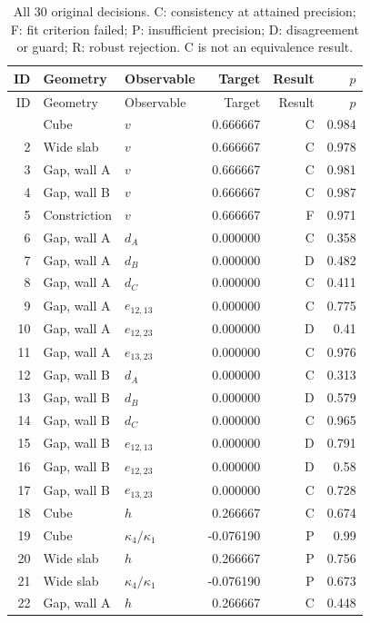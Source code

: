 {\small\setlength{\tabcolsep}{3.5pt}
\begin{longtable}{rllrrr}
\caption{All 30 original decisions. C: consistency at attained precision; F: fit criterion failed; P: insufficient precision; D: disagreement or guard; R: robust rejection. C is not an equivalence result.}\\
\toprule
ID & Geometry & Observable & Target & Result & $p$\\
\midrule
\endfirsthead
\toprule
ID & Geometry & Observable & Target & Result & $p$\\
\midrule
\endhead
\bottomrule\endfoot
1 & Cube & $v$ & 0.666667 & C & 0.984\\
2 & Wide slab & $v$ & 0.666667 & C & 0.978\\
3 & Gap, wall A & $v$ & 0.666667 & C & 0.981\\
4 & Gap, wall B & $v$ & 0.666667 & C & 0.987\\
5 & Constriction & $v$ & 0.666667 & F & 0.971\\
6 & Gap, wall A & $d_A$ & 0.000000 & C & 0.358\\
7 & Gap, wall A & $d_B$ & 0.000000 & D & 0.482\\
8 & Gap, wall A & $d_C$ & 0.000000 & C & 0.411\\
9 & Gap, wall A & $e_{12,13}$ & 0.000000 & C & 0.775\\
10 & Gap, wall A & $e_{12,23}$ & 0.000000 & D & 0.41\\
11 & Gap, wall A & $e_{13,23}$ & 0.000000 & C & 0.976\\
12 & Gap, wall B & $d_A$ & 0.000000 & C & 0.313\\
13 & Gap, wall B & $d_B$ & 0.000000 & D & 0.579\\
14 & Gap, wall B & $d_C$ & 0.000000 & C & 0.965\\
15 & Gap, wall B & $e_{12,13}$ & 0.000000 & D & 0.791\\
16 & Gap, wall B & $e_{12,23}$ & 0.000000 & D & 0.58\\
17 & Gap, wall B & $e_{13,23}$ & 0.000000 & C & 0.728\\
18 & Cube & $h$ & 0.266667 & C & 0.674\\
19 & Cube & $\kappa_4/\kappa_1$ & -0.076190 & P & 0.99\\
20 & Wide slab & $h$ & 0.266667 & P & 0.756\\
21 & Wide slab & $\kappa_4/\kappa_1$ & -0.076190 & P & 0.673\\
22 & Gap, wall A & $h$ & 0.266667 & C & 0.448\\

\end{longtable}}
